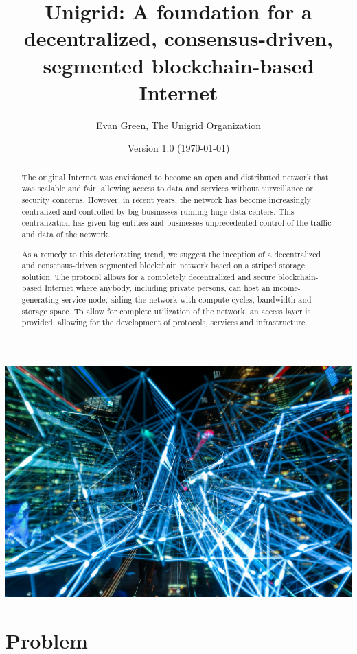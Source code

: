 \documentclass[12pt]{article}
\author{Evan Green, The Unigrid Organization}
\title{Unigrid: A foundation for a decentralized, consensus-driven, segmented blockchain-based Internet}
\date{Version 1.0 (\today)}
\begin{document}
\maketitle


\newpage
\thispagestyle{fancy}

\begin{abstract}
The original Internet was envisioned to become an open and distributed network that was scalable and fair, allowing access to data and services without surveillance or security concerns. However, in recent years, the network has become increasingly centralized and controlled by big businesses running huge data centers. This centralization has given big entities and businesses unprecedented control of the traffic and data of the network.

As a remedy to this deteriorating trend, we suggest the inception of a decentralized and consensus-driven segmented blockchain network based on a striped storage solution. The protocol allows for a completely decentralized and secure blockchain-based Internet where anybody, including private persons, can host an income-generating service node, aiding the network with compute cycles, bandwidth and storage space. To allow for complete utilization of the network, an access layer is provided, allowing for the development of protocols, services and infrastructure.

\end{abstract}

\includegraphics[scale=0.12]{lights}

\newpage
\section*{Problem}
\end{document}
